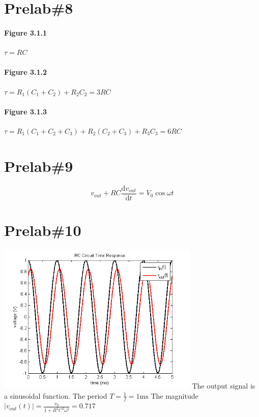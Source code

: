 \documentclass{IEEEtran}
\begin{document}
	\section{Prelab\#8}
		\paragraph{Figure 3.1.1} $\tau = RC$
		\paragraph{Figure 3.1.2} $\tau = R_1(C_1 + C_2) + R_2C_2 = 3RC$
		\paragraph{Figure 3.1.3} $\tau = R_1(C_1 + C_2 + C_3) + R_2(C_2 + C_3) + R_3C_3 = 6RC$
	\section{Prelab\#9}
	\begin{equation}
		v_{out} + RC\frac{\mathrm{d}v_{out}}{\mathrm{d}t} = V_0\cos{\omega t}
	\end{equation}
	\section{Prelab\#10}
		\includegraphics[width=3.8in]{images/Prelab10.png}
		The output signal is a sinusoidal function. \newline
		The period $T = \frac{1}{f} = 1\mathrm{ms}$ \newline
		The magnitude $|v_{out}(t)| = \frac{v_0}{1 + R^2C^2\omega^2} = 0.717$ 
\end{document}
